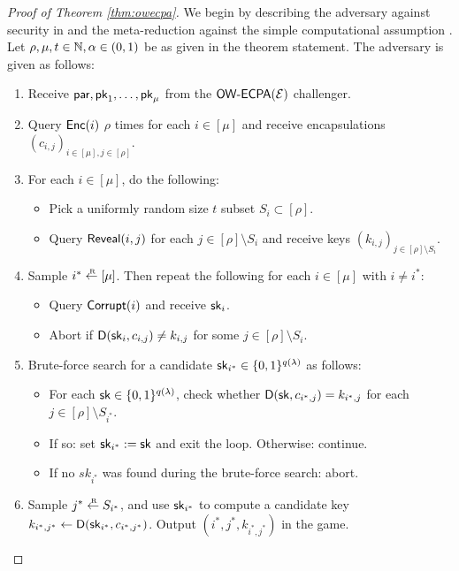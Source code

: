 \begin{proof}[Proof of Theorem \ref{thm:owecpa}]
  We begin by describing the adversary \advA against \OWECPA security in \KEM
  and the meta-reduction \redM against the simple computational assumption \Simple.
  Let \(\rho, \mu, t \in \mathbb{N}, \alpha \in (0,1)\) be as given in the theorem statement.
  The adversary \advA is given as follows:

  \begin{enumerate}[itemsep=0.1cm]
    \item\label{advA:init} Receive \(\mathsf{par}, \mathsf{pk}_{1}, \ldots, \mathsf{pk}_{\mu}\) from the \(\mathsf{OW}\text{-}\mathsf{ECPA}(\mathcal{E})\) challenger.
    \item\label{advA:query} Query \(\mathsf{Enc}(i)\) \(\rho\) times for each \(i \in [\mu]\) and receive encapsulations \((c_{i,j})_{i \in [\mu], j \in [\rho]}\).
    \item\label{advA:reveal} For each \(i \in [\mu]\), do the following:
          \begin{itemize}[label={\textbullet},itemsep=0.1cm]
            \item Pick a uniformly random size \(t\) subset \(S_{i} \subset [\rho]\).
            \item Query \(\mathsf{Reveal}(i,j)\) for each \(j \in [\rho] \setminus S_{i}\)
                  and receive keys \((k_{i,j})_{j \in [\rho] \setminus S_{i}}\).
          \end{itemize}
    \item\label{advA:corrupt} Sample \(i^{*} \sampleR [\mu]\). Then repeat the following for each \(i \in [\mu]\) with \(i \ne i^{*}\):
          \begin{itemize}[label={\textbullet},itemsep=0.1cm]
            \item Query \(\mathsf{Corrupt}(i)\) and receive \(\mathsf{sk}_{i}\).
            \item Abort if \(\mathsf{D}(\mathsf{sk}_{i},c_{i,j}) \ne k_{i,j}\) for some \(j \in [\rho] \setminus S_{i}\).
          \end{itemize}
     \item\label{advA:brute} Brute-force search for a candidate \(\mathsf{sk}_{i^{*}} \in \{0,1\}^{q(\lambda)}\) as follows:
          \begin{itemize}[label={\textbullet},itemsep=0.1cm]
            \item For each \(\mathsf{sk} \in \{0,1\}^{q(\lambda)}\),
                  check whether \(\mathsf{D}(\mathsf{sk},c_{i^{*},j}) = k_{i^{*},j}\) for each \(j \in [\rho] \setminus S_{i^{*}}\).
            \item If so: set \(\mathsf{sk}_{i^{*}} := \mathsf{sk}\) and exit the loop. Otherwise: continue.
            \item If no \(sk_{i^{*}}\) was found during the brute-force search: abort.
          \end{itemize}
    \item\label{advA:final} Sample \(j^{*} \sampleR S_{i^{*}}\),
          and use \(\mathsf{sk}_{i^{*}}\) to compute a candidate key \(k_{i^{*}, j^{*}} \leftarrow \mathsf{D}(\mathsf{sk}_{i^{*}},c_{i^{*}, j^{*}})\).
          Output \((i^{*}, j^{*}, k_{i^{*}, j^{*}})\) in the \OWECPA game.
  \end{enumerate}


\end{proof}
